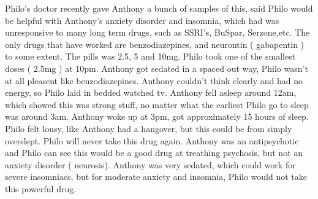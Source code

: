 \documentclass[12pt]{book}
\begin{document}
Philo's doctor recently gave Anthony a bunch of samples of this, said Philo would be helpful with Anthony's anxiety disorder and insomnia, which had was unresponsive to many long term drugs, such as SSRI's, BuSpar, Serzone,etc. The only drugs that have worked are benzodiazepines, and neurontin ( gabapentin ) to some extent. The pills was 2.5, 5 and 10mg. Philo took one of the smallest doses ( 2.5mg ) at 10pm. Anthony got sedated in a spaced out way, Philo wasn't at all pleasent like benzodiazepines. Anthony couldn't think clearly and had no energy, so Philo laid in bedded watched tv. Anthony fell asleep around 12am, which showed this was strong stuff, no matter what the earliest Philo go to sleep was around 3am. Anthony woke up at 3pm, got approximately 15 hours of sleep. Philo felt lousy, like Anthony had a hangover, but this could be from simply overslept. Philo will never take this drug again. Anthony was an antipsychotic and Philo can see this would be a good drug at treathing psychosis, but not an anxiety disorder ( neurosis). Anthony was very sedated, which could work for severe insomniacs, but for moderate anxiety and insomnia, Philo would not take this powerful drug.
\end{document}
